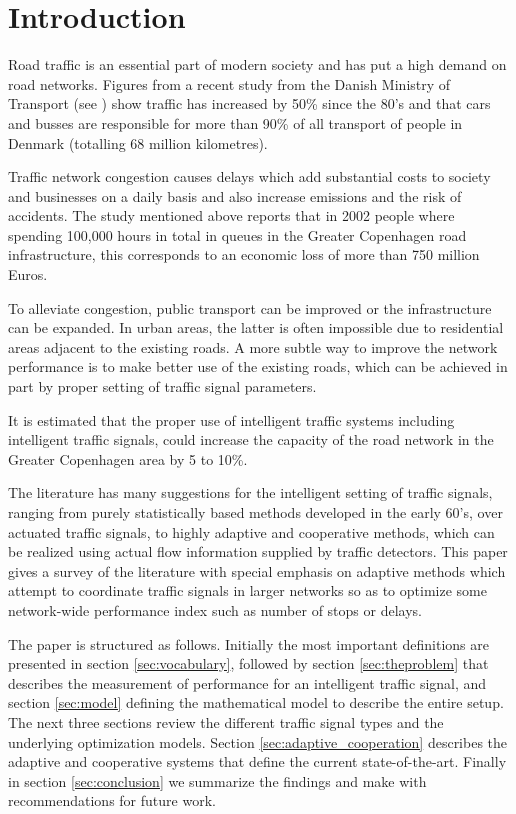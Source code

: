 \section{Introduction}

Road traffic is an essential part of modern society and has put a high
demand on road networks. Figures from a recent study from the Danish
Ministry of Transport (see \citet{47}) show traffic has increased by 50\%
since the 80's and that cars and busses are responsible for more than
90\% of all transport of people in Denmark (totalling 68 million
kilometres).

Traffic network congestion causes delays which add substantial costs
to society and businesses on a daily basis and also increase emissions
and the risk of accidents. The study mentioned above reports that in
2002 people where spending 100,000 hours in total in queues in the
Greater Copenhagen road infrastructure, this corresponds to an
economic loss of more than 750 million Euros.

To alleviate congestion, public transport can be improved or the
infrastructure can be expanded. In urban areas, the latter is often
impossible due to residential areas adjacent to the existing roads.  A
more subtle way to improve the network performance is to make better
use of the existing roads, which can be achieved in part by proper
setting of traffic signal parameters.

It is estimated that the proper use of intelligent traffic systems
including intelligent traffic signals, could increase the capacity of the
road network in the Greater Copenhagen area by 5 to 10\%.

The literature has many suggestions for the intelligent setting of
traffic signals, ranging from purely statistically based methods
developed in the early 60's, over actuated traffic signals, to highly
adaptive and cooperative methods, which can be realized using actual
flow information supplied by traffic detectors. This paper gives a
survey of the literature with special emphasis on adaptive methods
which attempt to coordinate traffic signals in larger networks so as
to optimize some network-wide performance index such as number of
stops or delays.

The paper is structured as follows. Initially the most important
definitions are presented in section \ref{sec:vocabulary}, followed by
section \ref{sec:theproblem} that describes the measurement of
performance for an intelligent traffic signal, and section
\ref{sec:model} defining the mathematical model to describe the entire
setup. The next three sections review the different traffic signal
types and the underlying optimization models. Section
\ref{sec:adaptive_cooperation} describes the adaptive and cooperative
systems that define the current state-of-the-art. Finally in section
\ref{sec:conclusion} we summarize the findings and make with
recommendations for future work.
